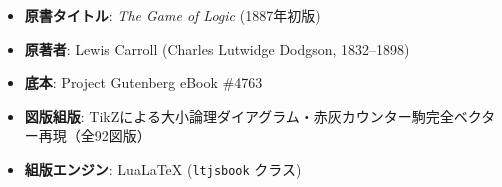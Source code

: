 \documentclass[a4paper,11pt,openany]{ltjsbook}
\begin{document}
\begin{tcolorbox}[colback=softpink, colframe=boxframe, title={\textbf{書誌情報・翻訳校閲メタデータ}}]
\begin{itemize}
    \item \textbf{原書タイトル}: \textit{The Game of Logic} (1887年初版)
    \item \textbf{原著者}: Lewis Carroll (Charles Lutwidge Dodgson, 1832--1898)
    \item \textbf{底本}: Project Gutenberg eBook \#4763
    \item \textbf{図版組版}: TikZによる大小論理ダイアグラム・赤灰カウンター駒完全ベクター再現（全92図版）
    \item \textbf{組版エンジン}: LuaLaTeX (\texttt{ltjsbook} クラス)
\end{itemize}
\end{tcolorbox}
\end{document}
